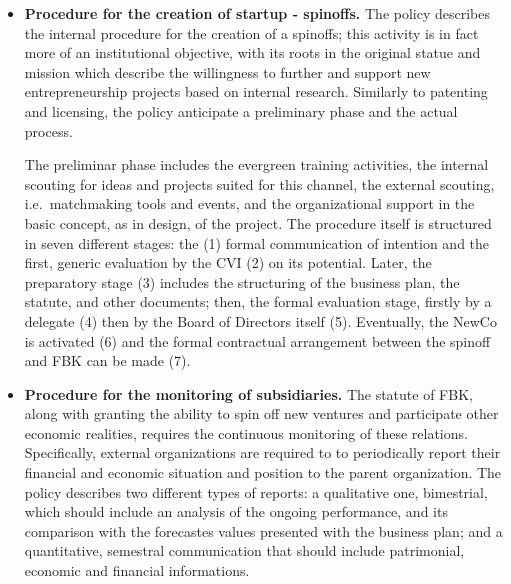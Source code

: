 \begin{itemize}
\item \textbf{Procedure for the creation of startup - spinoffs.} The policy describes the internal procedure for the creation of a spinoffs; this activity is in fact more of an institutional objective, with its roots in the original statue and mission which describe the willingness to further and support new entrepreneurship projects based on internal research. Similarly to patenting and licensing, the policy anticipate a preliminary phase and the actual process.

The preliminar phase includes the evergreen training activities, the internal scouting for ideas and projects suited for this channel, the external scouting, i.e.\ matchmaking tools and events, and the organizational support in the basic concept, as in design, of the project. The procedure itself is structured in seven different stages: the (1) formal communication of intention and the first, generic evaluation by the CVI (2) on its potential. Later, the preparatory stage (3) includes the structuring of the business plan, the statute, and other documents; then, the formal evaluation stage, firstly by a delegate (4) then by the Board of Directors itself (5). Eventually, the NewCo is activated (6) and the formal contractual arrangement between the spinoff and FBK can be made (7).

\item \textbf{Procedure for the monitoring of subsidiaries.} The statute of FBK, along with granting the ability to spin off new ventures and participate other economic realities, requires the continuous monitoring of these relations. Specifically, external organizations are required to to periodically report their financial and economic situation and position to the parent organization. The policy describes two different types of reports: a qualitative one, bimestrial, which should include an analysis of the ongoing performance, and its comparison with the forecastes values presented with the business plan; and a quantitative, semestral communication that should include patrimonial, economic and financial informations.

\end{itemize} 
